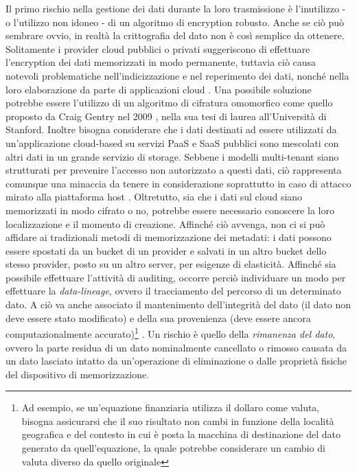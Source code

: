 \documentclass[../main.tex]{subfiles}
\begin{document}
Il primo rischio nella gestione dei dati durante la loro trasmissione è l'inutilizzo - o l'utilizzo non idoneo - di un algoritmo di encryption robusto. Anche se ciò può sembrare ovvio, in realtà la crittografia del dato non è così semplice da ottenere.
Solitamente i provider cloud pubblici o privati suggeriscono di effettuare l'encryption dei dati memorizzati in modo permanente, tuttavia ciò causa notevoli problematiche nell'indicizzazione e nel reperimento dei dati, nonché nella loro elaborazione da parte di applicazioni cloud \cite{CloudSecurityBook}.
Una possibile soluzione potrebbe essere l'utilizzo di un algoritmo di cifratura omomorfico come quello proposto da Craig Gentry nel 2009 \cite{Gentry}, nella sua tesi di laurea all'Università di Stanford.
Inoltre bisogna considerare che i dati destinati ad essere utilizzati da un'applicazione cloud-based su servizi PaaS e SaaS pubblici sono mescolati con altri dati in un grande servizio di storage.
Sebbene i modelli multi-tenant siano strutturati per prevenire l'accesso non autorizzato a questi dati, ciò rappresenta comunque una minaccia da tenere in considerazione soprattutto in caso di attacco mirato alla piattaforma host \cite{CloudSecurityBook}.
Oltretutto, sia che i dati sul cloud siano memorizzati in modo cifrato o no, potrebbe essere necessario conoscere la loro localizzazione e il momento di creazione. Affinché ciò avvenga, non ci si può affidare ai tradizionali metodi di memorizzazione dei metadati: i dati possono essere spostati da un bucket di un provider e salvati in un altro bucket dello stesso provider, posto su un altro server, per esigenze di elasticità.
Affinché sia possibile effettuare l'attività di auditing, occorre perciò individuare un modo per effettuare la \textit{data-lineage}, ovvero il tracciamento del percorso di un determinato dato.
A ciò va anche associato il mantenimento dell'integrità del dato (il dato non deve essere stato modificato) e della sua provenienza (deve essere ancora computazionalmente accurato)\footnote{Ad esempio, se un'equazione finanziaria utilizza il dollaro come valuta, bisogna assicurarsi che il suo risultato non cambi in funzione della località geografica e del contesto in cui è posta la macchina di destinazione del dato generato da quell'equazione, la quale potrebbe considerare un cambio di valuta diverso da quello originale} \cite{CloudSecurityBook}.
Un rischio è quello della \textit{rimanenza del dato}, ovvero la parte residua di un dato nominalmente cancellato o rimosso causata da un dato lasciato intatto da un'operazione di eliminazione o dalle proprietà fisiche del dispositivo di memorizzazione.
\end{document}
